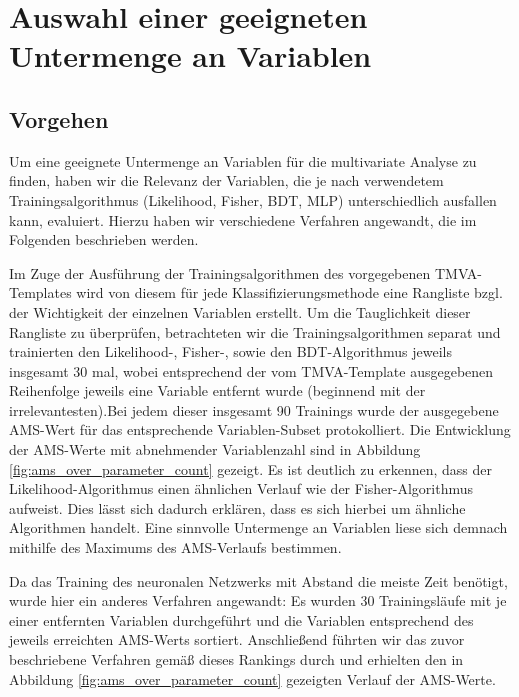 \section{Auswahl einer geeigneten Untermenge an Variablen}

\subsection{Vorgehen}
Um eine geeignete Untermenge an Variablen für die multivariate Analyse zu finden, haben wir die Relevanz der
Variablen, die je nach verwendetem Trainingsalgorithmus (Likelihood, Fisher, BDT, MLP) unterschiedlich ausfallen kann, evaluiert. Hierzu haben wir verschiedene Verfahren angewandt, die im Folgenden beschrieben werden.


Im Zuge der  Ausführung der Trainingsalgorithmen des vorgegebenen TMVA-Templates wird von diesem für jede Klassifizierungsmethode eine Rangliste bzgl. der Wichtigkeit der einzelnen Variablen erstellt. Um die Tauglichkeit dieser Rangliste zu überprüfen, betrachteten wir die Trainingsalgorithmen separat und trainierten den Likelihood-, Fisher-, sowie den BDT-Algorithmus jeweils insgesamt 30 mal, wobei entsprechend der vom TMVA-Template ausgegebenen Reihenfolge jeweils eine Variable entfernt wurde (beginnend mit der irrelevantesten).Bei jedem dieser insgesamt 90 Trainings wurde der ausgegebene AMS-Wert für das entsprechende Variablen-Subset protokolliert. Die Entwicklung der AMS-Werte mit abnehmender Variablenzahl sind in Abbildung \ref{fig:ams_over_parameter_count} gezeigt. Es ist deutlich zu erkennen, dass der Likelihood-Algorithmus einen ähnlichen Verlauf wie der Fisher-Algorithmus aufweist. Dies lässt sich dadurch erklären, dass es sich hierbei um ähnliche Algorithmen handelt. Eine sinnvolle Untermenge an Variablen liese sich demnach mithilfe des Maximums des AMS-Verlaufs bestimmen.

Da das Training des neuronalen Netzwerks mit Abstand die meiste Zeit benötigt, wurde hier ein anderes Verfahren angewandt: Es wurden 30 Trainingsläufe mit je einer entfernten Variablen durchgeführt und die Variablen entsprechend des jeweils erreichten AMS-Werts sortiert. Anschließend führten wir das zuvor beschriebene Verfahren gemäß dieses Rankings durch und erhielten den in Abbildung \ref{fig:ams_over_parameter_count} gezeigten Verlauf der AMS-Werte.


